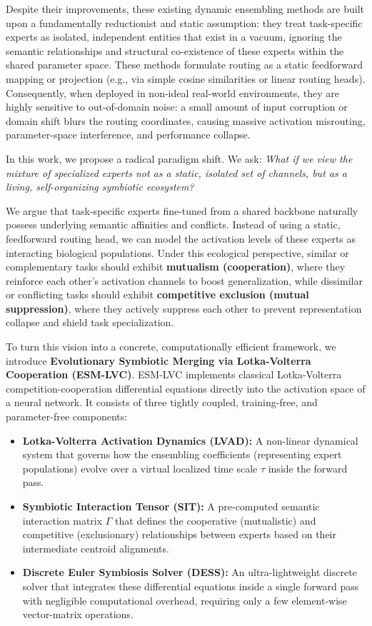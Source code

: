Despite their improvements, these existing dynamic ensembling methods are built upon a fundamentally reductionist and static assumption: they treat task-specific experts as isolated, independent entities that exist in a vacuum, ignoring the semantic relationships and structural co-existence of these experts within the shared parameter space. These methods formulate routing as a static feedforward mapping or projection (e.g., via simple cosine similarities or linear routing heads). Consequently, when deployed in non-ideal real-world environments, they are highly sensitive to out-of-domain noise: a small amount of input corruption or domain shift blurs the routing coordinates, causing massive activation misrouting, parameter-space interference, and performance collapse.

In this work, we propose a radical paradigm shift. We ask: \emph{What if we view the mixture of specialized experts not as a static, isolated set of channels, but as a living, self-organizing symbiotic ecosystem?} 

We argue that task-specific experts fine-tuned from a shared backbone naturally possess underlying semantic affinities and conflicts. Instead of using a static, feedforward routing head, we can model the activation levels of these experts as interacting biological populations. Under this ecological perspective, similar or complementary tasks should exhibit \textbf{mutualism (cooperation)}, where they reinforce each other's activation channels to boost generalization, while dissimilar or conflicting tasks should exhibit \textbf{competitive exclusion (mutual suppression)}, where they actively suppress each other to prevent representation collapse and shield task specialization.

To turn this vision into a concrete, computationally efficient framework, we introduce \textbf{Evolutionary Symbiotic Merging via Lotka-Volterra Cooperation (ESM-LVC)}. ESM-LVC implements classical Lotka-Volterra competition-cooperation differential equations directly into the activation space of a neural network. It consists of three tightly coupled, training-free, and parameter-free components:
\begin{itemize}
    \item \textbf{Lotka-Volterra Activation Dynamics (LVAD):} A non-linear dynamical system that governs how the ensembling coefficients (representing expert populations) evolve over a virtual localized time scale $\tau$ inside the forward pass.
    \item \textbf{Symbiotic Interaction Tensor (SIT):} A pre-computed semantic interaction matrix $\Gamma$ that defines the cooperative (mutualistic) and competitive (exclusionary) relationships between experts based on their intermediate centroid alignments.
    \item \textbf{Discrete Euler Symbiosis Solver (DESS):} An ultra-lightweight discrete solver that integrates these differential equations inside a single forward pass with negligible computational overhead, requiring only a few element-wise vector-matrix operations.
\end{itemize}

